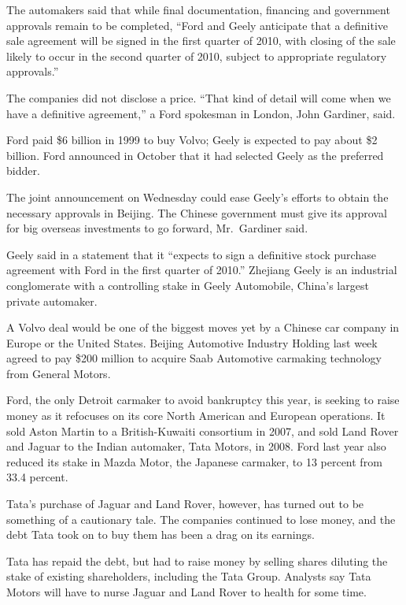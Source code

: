 ﻿\documentclass[12pt]{article}
\begin{document}
The automakers said that while final documentation, financing and government approvals remain to be
completed, ``Ford and Geely anticipate that a definitive sale agreement will be signed in the first
quarter of 2010, with closing of the sale likely to occur in the second quarter of 2010, subject to
appropriate regulatory approvals.''

The companies did not disclose a price. ``That kind of detail will come when we have a definitive
agreement,'' a Ford spokesman in London, John Gardiner, said.

Ford paid \$6 billion in 1999 to buy Volvo; Geely is expected to pay about \$2 billion. Ford
announced in October that it had selected Geely as the preferred bidder.

The joint announcement on Wednesday could ease Geely's efforts to obtain the necessary approvals in
Beijing. The Chinese government must give its approval for big overseas investments to go forward,
Mr.~Gardiner said.

Geely said in a statement that it ``expects to sign a definitive stock purchase agreement with Ford
in the first quarter of 2010.'' Zhejiang Geely is an industrial conglomerate with a controlling
stake in Geely Automobile, China's largest private automaker.

A Volvo deal would be one of the biggest moves yet by a Chinese car company in Europe or the United
States. Beijing Automotive Industry Holding last week agreed to pay \$200 million to acquire Saab
Automotive carmaking technology from General Motors.

Ford, the only Detroit carmaker to avoid bankruptcy this year, is seeking to raise money as it
refocuses on its core North American and European operations. It sold Aston Martin to a
British-Kuwaiti consortium in 2007, and sold Land Rover and Jaguar to the Indian automaker, Tata
Motors, in 2008. Ford last year also reduced its stake in Mazda Motor, the Japanese carmaker, to 13
percent from 33.4 percent.

Tata's purchase of Jaguar and Land Rover, however, has turned out to be something of a cautionary
tale. The companies continued to lose money, and the debt Tata took on to buy them has been a drag
on its earnings.

Tata has repaid the debt, but had to raise money by selling shares diluting the stake of existing
shareholders, including the Tata Group. Analysts say Tata Motors will have to nurse Jaguar and Land
Rover to health for some time.
\end{document}
